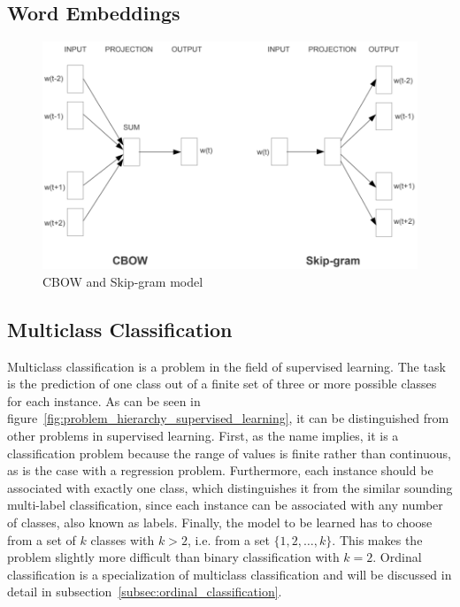 \documentclass[article,type=msc,colorback,accentcolor=tud7b]{tudthesis}
\begin{document}
  \subsection{Word Embeddings}
  \label{subsec:word_embeddings}
    
    \begin{figure}[H]
      \centering
      \includegraphics[scale=0.75]{images/word_embeddings}
      \caption[CBOW and Skip-gram model]{CBOW and Skip-gram model \autocite{Mikolov2013}}
      \label{fig:word_embeddings}
    \end{figure}
    
  \clearpage
  
  \subsection{Multiclass Classification}
  \label{subsec:multiclass_classification}  
    Multiclass classification is a problem in the field of supervised learning. The task is the prediction of one class out of a finite set of three or more possible classes for each instance. As can be seen in figure~\ref{fig:problem_hierarchy_supervised_learning}, it can be distinguished from other problems in supervised learning. First, as the name implies, it is a classification problem because the range of values is finite rather than continuous, as is the case with a regression problem. Furthermore, each instance should be associated with exactly one class, which distinguishes it from the similar sounding multi-label classification, since each instance can be associated with any number of classes, also known as labels. Finally, the model to be learned has to choose from a set of $k$ classes with $k>2$, i.e. from a set $\{1,2,\dots,k\}$. This makes the problem slightly more difficult than binary classification with $k=2$. Ordinal classification is a specialization of multiclass classification and will be discussed in detail in subsection~\ref{subsec:ordinal_classification}.
    
\end{document}
